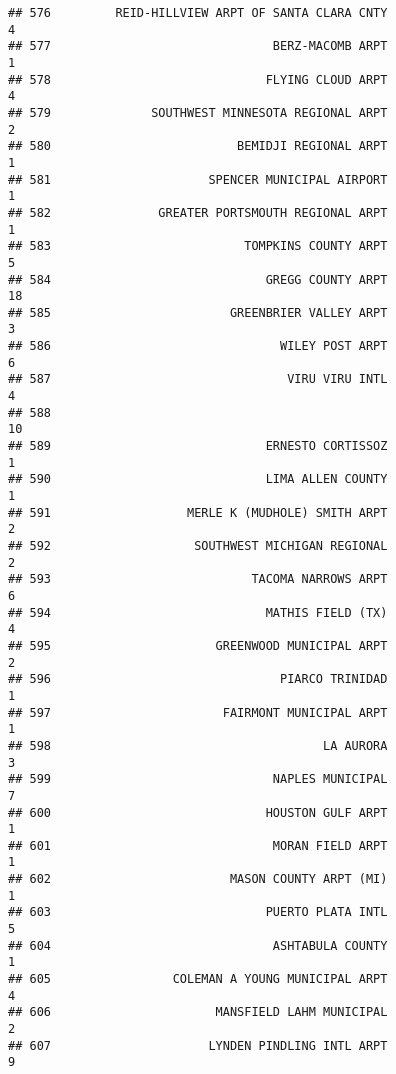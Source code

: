 \documentclass[
]{article}
\begin{document}
\begin{verbatim}
## 576         REID-HILLVIEW ARPT OF SANTA CLARA CNTY                           4
## 577                               BERZ-MACOMB ARPT                           1
## 578                              FLYING CLOUD ARPT                           4
## 579              SOUTHWEST MINNESOTA REGIONAL ARPT                           2
## 580                          BEMIDJI REGIONAL ARPT                           1
## 581                      SPENCER MUNICIPAL AIRPORT                           1
## 582               GREATER PORTSMOUTH REGIONAL ARPT                           1
## 583                           TOMPKINS COUNTY ARPT                           5
## 584                              GREGG COUNTY ARPT                          18
## 585                         GREENBRIER VALLEY ARPT                           3
## 586                                WILEY POST ARPT                           6
## 587                                 VIRU VIRU INTL                           4
## 588                                                                         10
## 589                              ERNESTO CORTISSOZ                           1
## 590                              LIMA ALLEN COUNTY                           1
## 591                   MERLE K (MUDHOLE) SMITH ARPT                           2
## 592                    SOUTHWEST MICHIGAN REGIONAL                           2
## 593                            TACOMA NARROWS ARPT                           6
## 594                              MATHIS FIELD (TX)                           4
## 595                       GREENWOOD MUNICIPAL ARPT                           2
## 596                                PIARCO TRINIDAD                           1
## 597                        FAIRMONT MUNICIPAL ARPT                           1
## 598                                      LA AURORA                           3
## 599                               NAPLES MUNICIPAL                           7
## 600                              HOUSTON GULF ARPT                           1
## 601                               MORAN FIELD ARPT                           1
## 602                         MASON COUNTY ARPT (MI)                           1
## 603                              PUERTO PLATA INTL                           5
## 604                               ASHTABULA COUNTY                           1
## 605                 COLEMAN A YOUNG MUNICIPAL ARPT                           4
## 606                       MANSFIELD LAHM MUNICIPAL                           2
## 607                      LYNDEN PINDLING INTL ARPT                           9

\end{verbatim}
\end{document}

